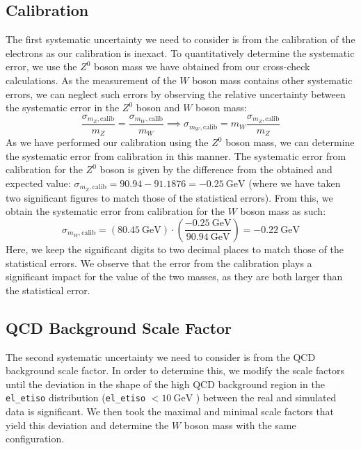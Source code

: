 \documentclass[a4paper]{report}
\numberwithin{equation}{section}
\begin{document}
\subsection{Calibration}

The first systematic uncertainty we need to consider is from the calibration of the electrons as our calibration is inexact. 
To quantitatively determine the systematic error, we use the $Z^0$ boson mass we have obtained from our cross-check calculations.
As the measurement of the $W$ boson mass contains other systematic errors, we can neglect such errors by observing the 
relative uncertainty between the systematic error in the $Z^0$ boson and $W$ boson mass:
\begin{equation}
    \frac{\sigma_{m_Z, \mathrm{calib}}}{m_Z} = \frac{\sigma_{m_W, \mathrm{calib}}}{m_W} \implies \sigma_{m_W, \mathrm{calib}} = m_W \frac{\sigma_{m_Z, \mathrm{calib}}}{m_Z}
\end{equation} 
As we have performed our calibration using the $Z^0$ boson mass, we can determine the systematic error from calibration in this manner. 
The systematic error from calibration for the $Z^0$ boson is given by the difference from the obtained and 
expected value: $\sigma_{m_Z, \mathrm{calib}} = 90.94 - 91.1876 = -\SI{0.25}{\giga\electronvolt}$ (where we have taken two 
significant figures to match those of the statistical errors). From this, we obtain the 
systematic error from calibration for the $W$ boson mass as such: 
\begin{equation}
    \sigma_{m_W, \mathrm{calib}} = (\SI{80.45}{\giga\electronvolt}) \cdot \left( \frac{\SI{-0.25}{\giga\electronvolt}}{\SI{90.94}{\giga\electronvolt}}\right) = -\SI{0.22}{\giga\electronvolt}
\end{equation}
Here, we keep the significant digits to two decimal places to match those of the statistical errors. We observe that the 
error from the calibration plays a significant impact for the value of the two masses, as they are both larger than the 
statistical error. 

\subsection{QCD Background Scale Factor}

The second systematic uncertainty we need to consider is from the QCD background scale factor. In order to determine this, we modify 
the scale factors until the deviation in the shape of the high QCD background region in the \texttt{el\_etiso} distribution 
(\texttt{el\_etiso} $< \SI{10}{\giga\electronvolt}$ ) between the real and simulated data is significant. We then took the 
maximal and minimal scale factors that yield this deviation and determine the $W$ boson mass with the same configuration. \par 
\end{document}
